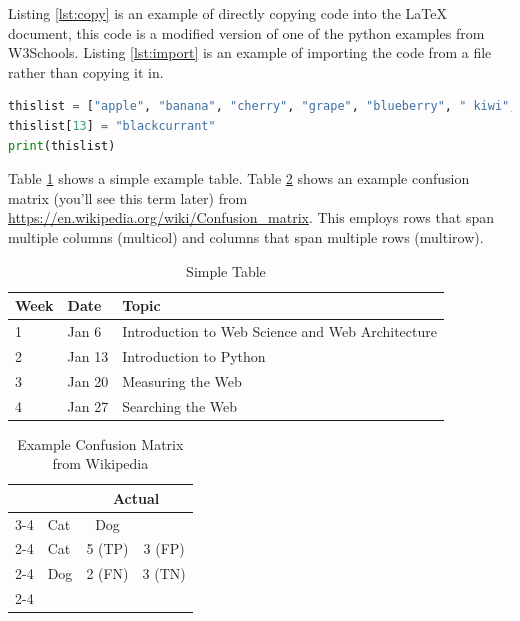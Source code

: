 \documentclass[12pt]{article}
\begin{document}
Listing \ref{lst:copy} is an example of directly copying code into the LaTeX document, this code is a modified version of one of the python examples from W3Schools. Listing \ref{lst:import} is an example of importing the code from a file rather than copying it in.

\begin{lstlisting}[language=Python, caption=Python example copied from W3Schools, label=lst:copy]
thislist = ["apple", "banana", "cherry", "grape", "blueberry", " kiwi", "apricot", "mango", "strawberry", "cantaloupe", "lemon", "orange", "lime", "cucumber", "durian", "fig", "grapefruit", "pear", "plum", "watermelon", "date", "elderberry", "guava"]
thislist[13] = "blackcurrant"
print(thislist)
\end{lstlisting}



Table \ref{tbl:simple} shows a simple example table.  Table \ref{tbl:confusion} shows an example confusion matrix (you'll see this term later) from \url{https://en.wikipedia.org/wiki/Confusion_matrix}. This employs rows that span multiple columns (multicol) and columns that span multiple rows (multirow). 

\begin{table}[h]
\centering
\caption{Simple Table}
\label{tbl:simple}
\begin{tabular}{|l|l|l|}
\hline
\textbf{Week} & \textbf{Date} & \textbf{Topic} \\ \hline \hline
1 & Jan 6& Introduction to Web Science and Web Architecture\\ \hline
2 & Jan 13& Introduction to Python\\ \hline
3 & Jan 20& Measuring the Web\\ \hline
 4& Jan 27&Searching the Web\\\hline
\end{tabular}
\end{table}

\begin{table}[h]
\centering
\caption{Example Confusion Matrix from Wikipedia}
\label{tbl:confusion}
\begin{tabular}{l|l|c|c|}
\multicolumn{2}{c}{}&\multicolumn{2}{c}{Actual}\\
\cline{3-4}
\multicolumn{2}{c|}{}&Cat&Dog\\
\cline{2-4}
\multirow{2}{*}{Predicted}& Cat & 5 (TP) & 3 (FP)\\
\cline{2-4}
& Dog & 2 (FN) & 3 (TN) \\
\cline{2-4}
\end{tabular}
\end{table}
\end{document}
